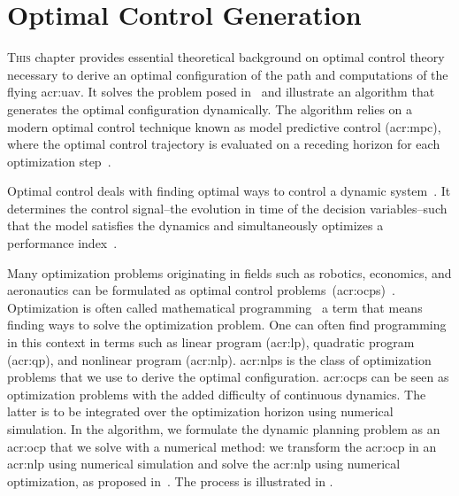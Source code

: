 
\chapter{Optimal Control Generation}
\label{cp:opt}


\lettrine{T}{his} chapter provides essential theoretical background on optimal control theory necessary to derive an optimal configuration of the path and computations of the flying \Gls{acr:uav}. It solves the problem posed in~ and illustrate an algorithm that generates the optimal configuration dynamically. The algorithm relies on a modern optimal control technique known as model predictive control (\Gls{acr:mpc}), where the optimal control trajectory is evaluated on a receding horizon for each optimization step~\citep{rawlings2017model}. 

Optimal control deals with finding optimal ways to control a dynamic system~\citep{sethi2019optimal}. It determines the control signal--the evolution in time of the decision variables--such that the model satisfies the dynamics and simultaneously optimizes a performance index~\citep{kirk2004optimal}.

Many optimization problems originating in fields such as robotics, economics, and aeronautics can be formulated as optimal control problems~(\Gls{acr:ocp}s)~\citep{von1992direct}. Optimization is often called mathematical programming~\citep{nocedal2006numerical} a term that means finding ways to solve the optimization problem. One can often find programming in this context in terms such as linear program (\Gls{acr:lp}), quadratic program (\Gls{acr:qp}), and nonlinear program (\Gls{acr:nlp}). \Gls{acr:nlp}s is the class of optimization problems that we use to derive the optimal configuration. \Gls{acr:ocp}s can be seen as optimization problems with the added difficulty of continuous dynamics. The latter is to be integrated over the optimization horizon using numerical simulation. In the algorithm, we formulate the dynamic planning problem as an \Gls{acr:ocp} that we solve with a numerical method: we transform the \Gls{acr:ocp} in an \Gls{acr:nlp} using numerical simulation and solve the \Gls{acr:nlp} using numerical optimization, as proposed in~\citep{rawlings2017model}. The process is illustrated in .

